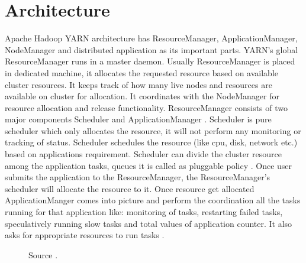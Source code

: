 \documentclass[9pt,twocolumn,twoside]{../../styles/osajnl}
\begin{document}
\section{Architecture}
Apache Hadoop YARN architecture has ResourceManager, ApplicationManager, NodeManager and distributed application as its important parts. YARN’s global ResourceManager runs in a master daemon. Usually ResourceManager is placed in dedicated machine, it allocates the requested resource based on available cluster resources. It keeps track of how many live nodes and resources are available on cluster for allocation. It coordinates with the NodeManager for resource allocation and release functionality. ResourceManager consists of two major components Scheduler and ApplicationManager \cite{www-2}. 
Scheduler is pure scheduler which only allocates the resource, it will not perform any monitoring or tracking of status. Scheduler schedules the resource (like cpu, disk, network etc.) based on applications requirement. Scheduler can divide the cluster resource among the application tasks, queues it is called as pluggable policy \cite{www-2}. Once user submits the application to the ResourceManager, the ResourceManager’s scheduler will allocate the resource to it. Once resource get allocated ApplicationManger comes into picture and perform the coordination all the tasks running for that application like: monitoring of tasks, restarting failed tasks, speculatively running slow tasks and total values of application counter. It also asks for appropriate resources to run tasks \cite{www-4}. 

\begin{figure}[htbp]
	\centering
	\caption{Source \cite{www-1}. }
	\label{fig:false-color}
\end{figure}
\end{document}
